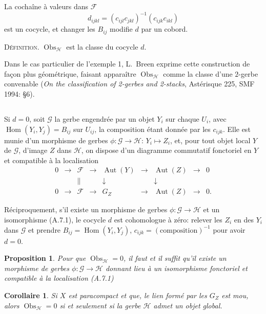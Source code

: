 \documentclass[11pt,a4paper]{article}
\theoremstyle{plain}
\newtheorem{proposition}[theorem]{Proposition}
\newtheorem{corollary}[theorem]{Corollaire}
\theoremstyle{definition}
\DeclareMathOperator{\Hom}{Hom}
\DeclareMathOperator{\Aut}{Aut}
\DeclareMathOperator{\Obs}{Obs}
\begin{document}
La cocha\^ine \`a valeurs dans $\mathcal{F}$
\[
d_{ijkl} = (c_{ijl} c_{jkl})^{-1} (c_{ijk} c_{ikl})
\]
est un cocycle, et changer les $B_{ij}$ modifie $d$ par un cobord.

\noindent \textsc{D\'efinition.} $\Obs_{\mathcal{H}}$ est la classe du cocycle $d$.

Dans le cas particulier de l'exemple 1, L.~Breen exprime cette construction de fa\c{c}on plus g\'eom\'etrique, faisant appara\^itre $\Obs_{\mathcal{H}}$ comme la classe d'une $2$-gerbe convenable (\textit{On the classification of 2-gerbes and 2-stacks}, Ast\'erisque 225, SMF
1994: \S 6).

\subsection{}
Si $d = 0$, soit $\mathcal{G}$ la gerbe engendr\'ee par un objet $Y_{i}$ sur chaque $U_{i}$, avec
$\Hom(Y_{i}, Y_{j}) = B_{ij}$ sur $U_{ij}$, la composition \'etant donn\'ee par les $c_{ijk}$. Elle est munie
d'un morphisme de gerbes $\phi: \mathcal{G} \to \mathcal{H}$: $Y_{i} \mapsto Z_{i}$, et, pour tout objet local $Y$ de $\mathcal{G}$,
d'image $Z$ dans $\mathcal{H}$, on dispose d'un diagramme commutatif fonctoriel en $Y$ et
compatible \`a la localisation
\[
\begin{array}{ccccccccc}
0 & \longrightarrow & \mathcal{F} & \longrightarrow & \Aut(Y) & \longrightarrow & \Aut(Z) & \longrightarrow & 0 \\
& & \| & & \downarrow & & \downarrow & & \\
0 & \longrightarrow & \mathcal{F} & \longrightarrow & G_{Z} & \longrightarrow & \Aut(Z) & \longrightarrow & 0.
\end{array} \tag{A.7.1}
\]

R\'eciproquement, s'il existe un morphisme de gerbes $\phi: \mathcal{G} \to \mathcal{H}$ et un isomorphisme (A.7.1), le cocycle $d$ est cohomologue \`a z\'ero: relever les $Z_{i}$ en des $Y_{i}$ dans $\mathcal{G}$ et prendre $B_{ij} = \Hom(Y_{i}, Y_{j})$, $c_{ijk} = (\text{composition})^{-1}$ pour avoir $d = 0$.

\begin{proposition}
Pour que $\Obs_{\mathcal{H}} = 0$, il faut et il suffit qu'il existe un morphisme de gerbes $\phi: \mathcal{G} \to \mathcal{H}$ donnant lieu \`a un isomorphisme fonctoriel et compatible \`a la localisation (A.7.1)
\end{proposition}

\begin{corollary}
Si $X$ est paracompact et que, le lien form\'e par les $G_{Z}$ est mou,
alors $\Obs_{\mathcal{H}} = 0$ si et seulement si la gerbe $\mathcal{H}$ admet un objet global.
\end{corollary}
\end{document}
